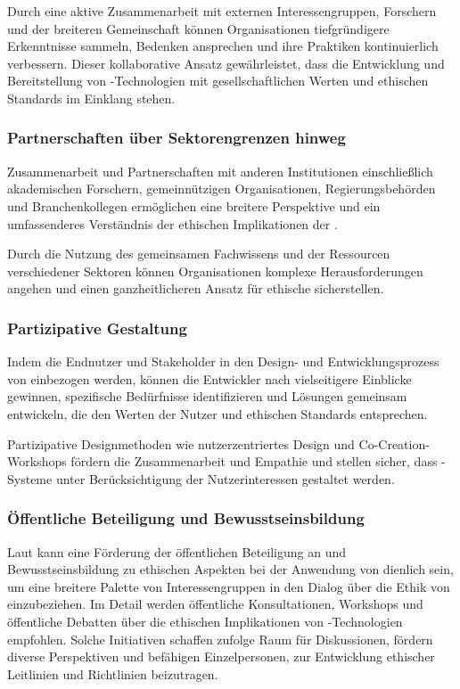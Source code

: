 \documentclass[hidelinks,12pt]{report}
\begin{document}
Durch eine aktive Zusammenarbeit mit externen Interessengruppen, Forschern und der breiteren Gemeinschaft können Organisationen tiefgründigere Erkenntnisse sammeln, Bedenken ansprechen und ihre Praktiken kontinuierlich verbessern. Dieser kollaborative Ansatz gewährleistet, dass die Entwicklung und Bereitstellung von  -Technologien mit gesellschaftlichen Werten und ethischen Standards im Einklang stehen.\cite{EUCommision}\cite{UNESCO}

\subsubsection{Partnerschaften über Sektorengrenzen hinweg}
Zusammenarbeit und Partnerschaften mit anderen Institutionen einschließlich akademischen Forschern, gemeinnützigen Organisationen, Regierungsbehörden und Branchenkollegen ermöglichen eine breitere Perspektive und ein umfassenderes Verständnis der ethischen Implikationen der . 

Durch die Nutzung des gemeinsamen Fachwissens und der Ressourcen verschiedener Sektoren können Organisationen komplexe Herausforderungen angehen und einen ganzheitlicheren Ansatz für ethische  sicherstellen.\cite{Vogel}

\subsubsection{Partizipative Gestaltung}
Indem die Endnutzer und Stakeholder in den Design- und Entwicklungsprozess von   einbezogen werden, können die Entwickler nach \cite{Zytko} vielseitigere Einblicke gewinnen, spezifische Bedürfnisse identifizieren und Lösungen gemeinsam entwickeln, die den Werten der Nutzer und ethischen Standards entsprechen. 

Partizipative Designmethoden wie nutzerzentriertes Design und Co-Creation-Workshops fördern die Zusammenarbeit und Empathie und stellen sicher, dass -Systeme unter Berücksichtigung der Nutzerinteressen gestaltet werden.

\subsubsection{Öffentliche Beteiligung und Bewusstseinsbildung}
Laut \cite{WILSON2022101652} kann eine Förderung der öffentlichen Beteiligung an und Bewusstseinsbildung zu ethischen Aspekten bei der Anwendung von  dienlich sein, um eine breitere Palette von Interessengruppen in den Dialog über die Ethik von  einzubeziehen. Im Detail werden öffentliche Konsultationen, Workshops und öffentliche Debatten über die ethischen Implikationen von -Technologien empfohlen. Solche Initiativen schaffen \cite{WILSON2022101652} zufolge Raum für Diskussionen, fördern diverse Perspektiven und befähigen Einzelpersonen, zur Entwicklung ethischer Leitlinien und Richtlinien beizutragen.
\end{document}
